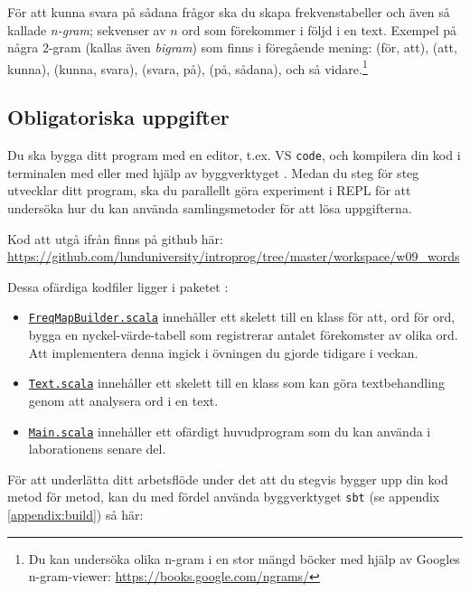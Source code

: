 \noindent För att kunna svara på sådana frågor ska du skapa frekvenstabeller och även så kallade \emph{n-gram}; sekvenser av $n$ ord som förekommer i följd i en text. Exempel på några 2-gram (kallas även \emph{bigram}) som finns i föregående mening: (för, att), (att, kunna), (kunna, svara), (svara, på), (på, sådana), och så vidare.\footnote{Du kan undersöka olika n-gram i en stor mängd böcker med hjälp av Googles n-gram-viewer: \url{https://books.google.com/ngrams/}}

\subsection{Obligatoriska uppgifter}

Du ska bygga ditt program med en editor, t.ex. VS \texttt{code}, och kompilera din kod i terminalen med  eller med hjälp av byggverktyget . Medan du steg för steg utvecklar ditt program, ska du parallellt göra experiment i REPL för att undersöka hur du kan använda samlingsmetoder för att lösa uppgifterna.

Kod att utgå ifrån finns på github här: \url{https://github.com/lunduniversity/introprog/tree/master/workspace/w09_words}

Dessa ofärdiga kodfiler ligger i paketet :
\begin{itemize}
  \item \href{https://github.com/lunduniversity/introprog/blob/master/workspace/w09_words/FreqMapBuilder.scala}{\texttt{FreqMapBuilder.scala}} innehåller ett skelett till en klass för att, ord för ord, bygga en nyckel-värde-tabell som registrerar antalet förekomster av olika ord. Att implementera denna ingick i övningen du gjorde tidigare i veckan.

  \item \href{https://github.com/lunduniversity/introprog/blob/master/workspace/w09_words/Text.scala}{\texttt{Text.scala}} innehåller ett skelett till en klass som kan göra textbehandling genom att analysera ord i en text.

  \item \href{}{\texttt{}} \href{https://github.com/lunduniversity/introprog/blob/master/workspace/w09_words/Main.scala}{\texttt{Main.scala}} innehåller ett ofärdigt huvudprogram som du kan använda i laborationens senare del.
\end{itemize}

För att underlätta ditt arbetsflöde under det att du stegvis bygger upp din kod metod för metod, kan du med fördel använda byggverktyget \texttt{sbt} (se appendix \ref{appendix:build}) så här:

